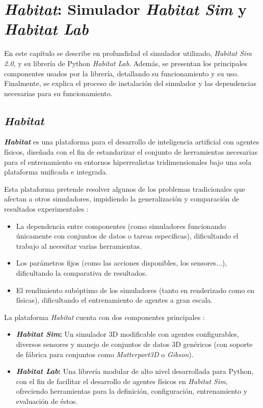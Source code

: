 
\chapter{\textit{Habitat}: Simulador \textit{Habitat Sim} y \textit{Habitat Lab}}

En este capítulo se describe en profundidad el simulador utilizado, \textit{Habitat Sim 2.0}, y su librería de Python \textit{Habitat Lab}. Además, se presentan los principales componentes usados por la librería, detallando su funcionamiento y su uso. Finalmente, se explica el proceso de instalación del simulador y las dependencias necesarias para su funcionamiento.

\section{\textit{Habitat}}

\textbf{\textit{Habitat}} \cite{habitat19iccv} es una plataforma para el desarrollo de inteligencia artificial con agentes físicos, diseñada con el fin de estandarizar el conjunto de herramientas necesarias para el entrenamiento en entornos hiperrealistas tridimensionales bajo una sola plataforma unificada e integrada.

Esta plataforma pretende resolver algunos de los problemas tradicionales que afectan a otros simuladores, impidiendo la generalización y comparación de resultados experimentales \cite{habitat19iccv}:
\begin{itemize}
	\item La dependencia entre componentes (como simuladores funcionando únicamente con conjuntos de datos o tareas especificas), dificultando el trabajo al necesitar varias herramientas.
	\item Los parámetros fijos (como las acciones disponibles, los sensores...), dificultando la comparativa de resultados.
	\item El rendimiento subóptimo de los simuladores (tanto en renderizado como en físicas), dificultando el entrenamiento de agentes a gran escala. 
\end{itemize}

La plataforma \textit{Habitat} cuenta con dos componentes principales \cite{habitat19iccv}:
\begin{itemize}
	\item \textbf{\textit{Habitat Sim}:} Un simulador 3D modificable con agentes configurables, diversos sensores y manejo de conjuntos de datos 3D genéricos (con soporte de fábrica para conjuntos como \textit{Matterport3D} o \textit{Gibson}).
	\item \textbf{\textit{Habitat Lab}:} Una librería modular de alto nivel desarrollada para Python, con el fin de facilitar el desarrollo de agentes físicos en \textit{Habitat Sim}, ofreciendo herramientas para la definición, configuración, entrenamiento y evaluación de éstos.
\end{itemize}

